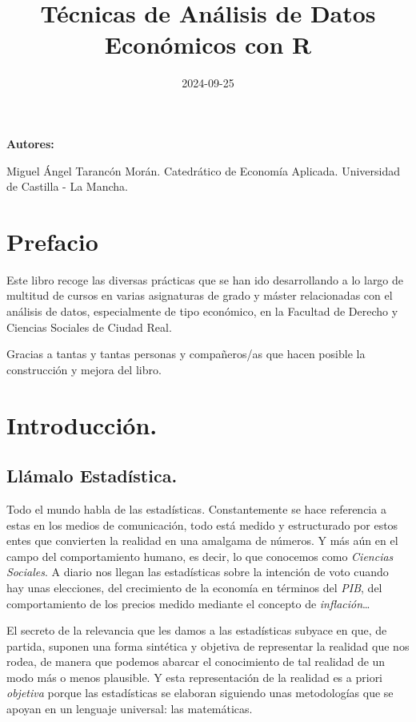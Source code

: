 \documentclass[
]{book}
\title{Técnicas de Análisis de Datos Económicos con R}
\author{}
\date{\vspace{-2.5em}2024-09-25}
\begin{document}
\maketitle

{
\setcounter{tocdepth}{1}
\tableofcontents
}
\chapter*{}\label{section}

\textbf{Autores:}

Miguel Ángel Tarancón Morán. Catedrático de Economía Aplicada. Universidad de Castilla - La Mancha.

\chapter*{Prefacio}\label{prefacio}

Este libro recoge las diversas prácticas que se han ido desarrollando a lo largo de multitud de cursos en varias asignaturas de grado y máster relacionadas con el análisis de datos, especialmente de tipo económico, en la Facultad de Derecho y Ciencias Sociales de Ciudad Real.

Gracias a tantas y tantas personas y compañeros/as que hacen posible la construcción y mejora del libro.

\chapter{Introducción.}\label{introducciuxf3n.}

\section{Llámalo Estadística.}\label{lluxe1malo-estaduxedstica.}

Todo el mundo habla de las estadísticas. Constantemente se hace referencia a estas en los medios de comunicación, todo está medido y estructurado por estos entes que convierten la realidad en una amalgama de números. Y más aún en el campo del comportamiento humano, es decir, lo que conocemos como \emph{Ciencias Sociales}. A diario nos llegan las estadísticas sobre la intención de voto cuando hay unas elecciones, del crecimiento de la economía en términos del \emph{PIB}, del comportamiento de los precios medido mediante el concepto de \emph{inflación}\ldots{}

El secreto de la relevancia que les damos a las estadísticas subyace en que, de partida, suponen una forma sintética y objetiva de representar la realidad que nos rodea, de manera que podemos abarcar el conocimiento de tal realidad de un modo más o menos plausible. Y esta representación de la realidad es a priori \emph{objetiva} porque las estadísticas se elaboran siguiendo unas metodologías que se apoyan en un lenguaje universal: las matemáticas.
\end{document}
